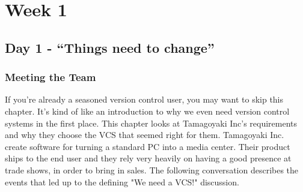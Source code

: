 \chapter{Week 1}
\section{Day 1 - ``Things need to change''}
\subsection{Meeting the Team}

If you're already a seasoned version control user, you may want to skip this chapter.
It's kind of like an introduction to why we even need version control systems in the first place.
This chapter looks at Tamagoyaki Inc's requirements and why they choose the VCS that seemed right for them.
Tamagoyaki Inc.
create software for turning a standard PC into a media center.
Their product ships to the end user and they rely very heavily on having a good presence at trade shows, in order to bring in sales.
The following conversation describes the events that led up to the defining "We need a VCS!" discussion.

